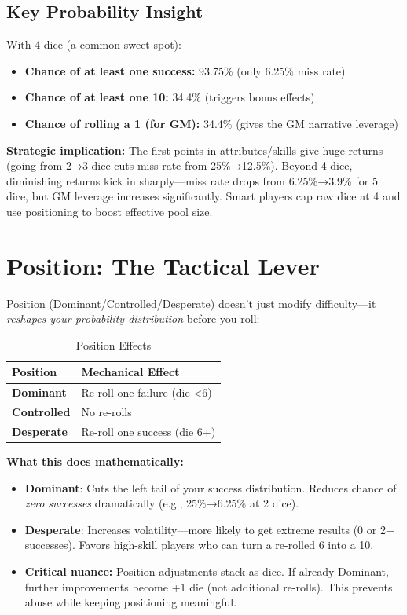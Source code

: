 \documentclass[11pt]{article}
\begin{document}
\subsection{Key Probability Insight}
With 4 dice (a common sweet spot):
\begin{itemize}
    \item \textbf{Chance of at least one success:} 93.75\% (only 6.25\% miss rate)
    \item \textbf{Chance of at least one 10:} 34.4\% (triggers bonus effects)
    \item \textbf{Chance of rolling a 1 (for GM):} 34.4\% (gives the GM narrative leverage)
\end{itemize}

\textbf{Strategic implication:} The first points in attributes/skills give huge returns (going from 2→3 dice cuts miss rate from 25\%→12.5\%). Beyond 4 dice, diminishing returns kick in sharply—miss rate drops from 6.25\%→3.9\% for 5 dice, but GM leverage increases significantly. Smart players cap raw dice at 4 and use positioning to boost effective pool size.

\section{Position: The Tactical Lever}

Position (Dominant/Controlled/Desperate) doesn't just modify difficulty—it \textit{reshapes your probability distribution} before you roll:

\begin{table}[h]
\centering
\caption{Position Effects}
\begin{tabular}{>{\bfseries}l l}
\toprule
Position & Mechanical Effect \\
\midrule
Dominant & Re-roll one failure (die <6) \\
Controlled & No re-rolls \\
Desperate & Re-roll one success (die 6+) \\
\bottomrule
\end{tabular}
\end{table}

\textbf{What this does mathematically:}
\begin{itemize}
    \item \textbf{Dominant}: Cuts the left tail of your success distribution. Reduces chance of \textit{zero successes} dramatically (e.g., 25\%→6.25\% at 2 dice).
    \item \textbf{Desperate}: Increases volatility—more likely to get extreme results (0 or 2+ successes). Favors high-skill players who can turn a re-rolled 6 into a 10.
    \item \textbf{Critical nuance:} Position adjustments stack as dice. If already Dominant, further improvements become +1 die (not additional re-rolls). This prevents abuse while keeping positioning meaningful.
\end{itemize}
\end{document}
